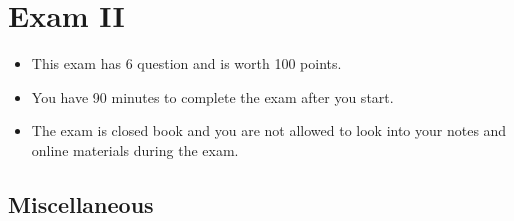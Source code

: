 \chapter{Exam II}
\label{ch:exam2}

\begin{preamble}
\begin{itemize}
\item This exam has 6 question and is worth 100 points.
\item You have 90 minutes to complete the exam after you start.
\item The exam is closed book and you are not allowed to look into your notes and online materials during the exam.
\end{itemize}
\end{preamble}

\section{Miscellaneous}

